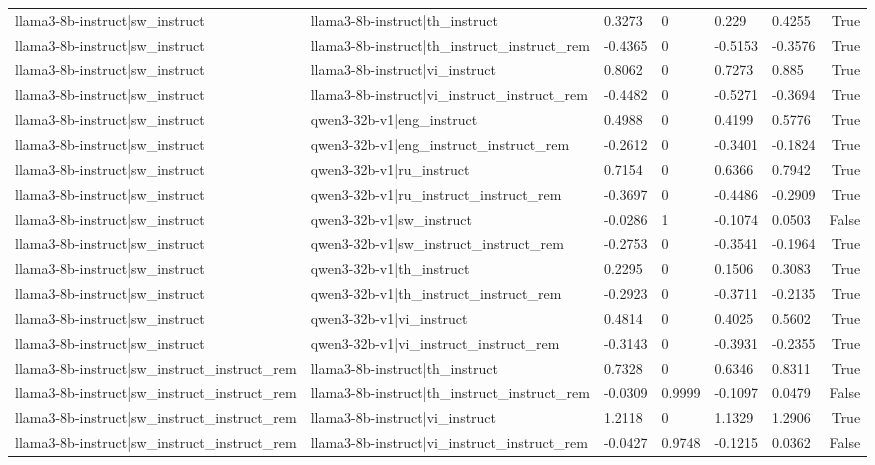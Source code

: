 \begin{table}
\begin{tabular}{llllllr}
llama3-8b-instruct|sw_instruct & llama3-8b-instruct|th_instruct & 0.3273 & 0 & 0.229 & 0.4255 & True \\
llama3-8b-instruct|sw_instruct & llama3-8b-instruct|th_instruct_instruct_rem & -0.4365 & 0 & -0.5153 & -0.3576 & True \\
llama3-8b-instruct|sw_instruct & llama3-8b-instruct|vi_instruct & 0.8062 & 0 & 0.7273 & 0.885 & True \\
llama3-8b-instruct|sw_instruct & llama3-8b-instruct|vi_instruct_instruct_rem & -0.4482 & 0 & -0.5271 & -0.3694 & True \\
llama3-8b-instruct|sw_instruct & qwen3-32b-v1|eng_instruct & 0.4988 & 0 & 0.4199 & 0.5776 & True \\
llama3-8b-instruct|sw_instruct & qwen3-32b-v1|eng_instruct_instruct_rem & -0.2612 & 0 & -0.3401 & -0.1824 & True \\
llama3-8b-instruct|sw_instruct & qwen3-32b-v1|ru_instruct & 0.7154 & 0 & 0.6366 & 0.7942 & True \\
llama3-8b-instruct|sw_instruct & qwen3-32b-v1|ru_instruct_instruct_rem & -0.3697 & 0 & -0.4486 & -0.2909 & True \\
llama3-8b-instruct|sw_instruct & qwen3-32b-v1|sw_instruct & -0.0286 & 1 & -0.1074 & 0.0503 & False \\
llama3-8b-instruct|sw_instruct & qwen3-32b-v1|sw_instruct_instruct_rem & -0.2753 & 0 & -0.3541 & -0.1964 & True \\
llama3-8b-instruct|sw_instruct & qwen3-32b-v1|th_instruct & 0.2295 & 0 & 0.1506 & 0.3083 & True \\
llama3-8b-instruct|sw_instruct & qwen3-32b-v1|th_instruct_instruct_rem & -0.2923 & 0 & -0.3711 & -0.2135 & True \\
llama3-8b-instruct|sw_instruct & qwen3-32b-v1|vi_instruct & 0.4814 & 0 & 0.4025 & 0.5602 & True \\
llama3-8b-instruct|sw_instruct & qwen3-32b-v1|vi_instruct_instruct_rem & -0.3143 & 0 & -0.3931 & -0.2355 & True \\
llama3-8b-instruct|sw_instruct_instruct_rem & llama3-8b-instruct|th_instruct & 0.7328 & 0 & 0.6346 & 0.8311 & True \\
llama3-8b-instruct|sw_instruct_instruct_rem & llama3-8b-instruct|th_instruct_instruct_rem & -0.0309 & 0.9999 & -0.1097 & 0.0479 & False \\
llama3-8b-instruct|sw_instruct_instruct_rem & llama3-8b-instruct|vi_instruct & 1.2118 & 0 & 1.1329 & 1.2906 & True \\
llama3-8b-instruct|sw_instruct_instruct_rem & llama3-8b-instruct|vi_instruct_instruct_rem & -0.0427 & 0.9748 & -0.1215 & 0.0362 & False \\

\end{tabular}
\end{table}
